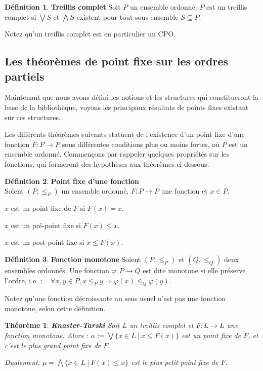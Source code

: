 \documentclass{article}
\newtheorem{theorem}{Théorème}[section]
\theoremstyle{definition}
\newtheorem{definition}{Définition}[section]
\begin{document}
\begin{definition}{\textbf{Treillis complet}}
Soit $P$ un ensemble ordonné. $P$ est un treillis complet si $\bigvee S$ et $\bigwedge S$ existent pour tout sous-ensemble $S \subseteq P$.

\end{definition}
Notez qu'un treillis complet est en particulier un CPO.

\subsection{Les théorèmes de point fixe sur les ordres partiels}

Maintenant que nous avons défini les notions et les structures qui constitueront la base de la bibliothèque, voyons les principaux résultats de points fixes existant sur ces structures.

Les différents théorèmes suivants statuent de l'existence d'un point fixe d'une fonction $F : P \rightarrow P$ sous différentes conditions plus ou moins fortes, où $P$ est un ensemble ordonné. Commençons par rappeler quelques propriétés sur les fonctions, qui formeront des hypothèses aux théorèmes ci-dessous.

\begin{definition}{\textbf{Point fixe d'une fonction\\}}
\label{fixpoint-def}
Soient $(P, \leq_P)$ un ensemble ordonné, $F : P \rightarrow P$ une fonction et $x \in P$.

$x$ est un point fixe de $F$ si $F(x) = x$.

$x$ est un pré-point fixe si $F(x) \leq x$.

$x$ est un post-point fixe si $x \leq F(x)$.
\end{definition}

\begin{definition}{\textbf{Fonction monotone}}
Soient $(P, \leq_P)$ et $(Q, \leq_Q)$ deux ensembles ordonnés. Une fonction $\varphi : P \rightarrow Q$ est dite monotone si elle préserve l'ordre, i.e. : ~ $\forall x, y \in P, x \leq_P y \Longrightarrow \varphi(x) \leq_Q \varphi(y)$.

Notez qu'une fonction décroissante au sens usuel n'est pas une fonction monotone, selon cette définition.
\end{definition}

\begin{theorem}{\textbf{Knaster-Tarski}}
Soit $L$ un treillis complet et $F : L \rightarrow L$ une fonction monotone. Alors :
$ \alpha := \bigvee \{x \in L ~|~ x \leq F(x)\}$
est un point fixe de $F$, et c'est le plus grand point fixe de $F$.

\noindent Dualement, $\mu = \bigwedge \{x \in L ~|~ F(x) \leq x\}$ est le plus petit point fixe de $F$.
\end{theorem}
\end{document}
